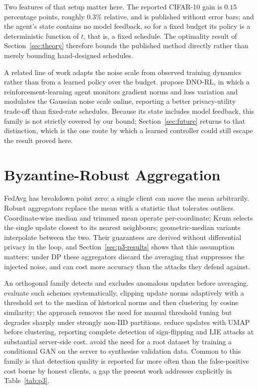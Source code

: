 Two features of that setup matter here. The reported CIFAR-10 gain is
$0.15$ percentage points, roughly $0.3\%$ relative, and is published without
error bars; and the agent's state contains no model feedback, so for a fixed
budget its policy is a deterministic function of $t$, that is, a fixed schedule.
The optimality result of Section~\ref{sec:theory} therefore bounds the published
method directly rather than merely bounding hand-designed schedules.

\vspace{10pt}

A related line of work adapts the noise scale from observed training dynamics
rather than from a learned policy over the budget. \citeauthor{WangDNORL}
\cite{WangDNORL} propose DNO-RL, in which a reinforcement-learning agent
monitors gradient norms and loss variation and modulates the Gaussian noise
scale online, reporting a better privacy-utility trade-off than fixed-rate
schedules. Because its state includes model feedback, this family is not
strictly covered by our bound; Section~\ref{sec:future} returns to that
distinction, which is the one route by which a learned controller could still
escape the result proved here.

\section{Byzantine-Robust Aggregation}

FedAvg has breakdown point zero: a single client can move the mean arbitrarily.
Robust aggregators replace the mean with a statistic that tolerates outliers.
Coordinate-wise median and trimmed mean \cite{yin2018byzantine} operate
per-coordinate; Krum \cite{blanchard2017machine} selects the single update
closest to its nearest neighbours; geometric-median variants interpolate between
the two. Their guarantees are derived without differential privacy in the loop,
and Section~\ref{sec:p3-results} shows that this assumption matters: under DP
these aggregators discard the averaging that suppresses the injected noise, and
can cost more accuracy than the attacks they defend against.

\vspace{10pt}

An orthogonal family detects and excludes anomalous updates before averaging.
\citeauthor{Li_2024} \cite{Li_2024} evaluate such schemes systematically,
clipping update norms adaptively with a threshold set to the median of
historical norms and then clustering by cosine similarity; the approach removes
the need for manual threshold tuning but degrades sharply under strongly
non-IID partitions. \citeauthor{10529118} \cite{10529118} reduce updates
with UMAP before clustering, reporting complete detection of sign-flipping and
LIE attacks at substantial server-side cost. \citeauthor{ZafarGANRobustFL}
\cite{ZafarGANRobustFL} avoid the need for a root dataset by training a
conditional GAN on the server to synthesise validation data. Common to this
family is that detection quality is reported far more often than the
false-positive cost borne by honest clients, a gap the present work addresses
explicitly in Table~\ref{tab:p3}.

